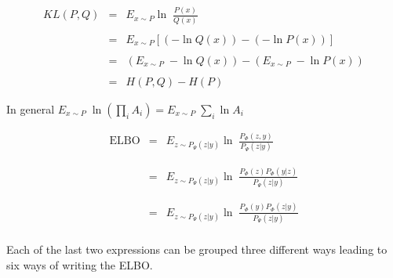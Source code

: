 {

\begin{eqnarray*}
KL(P,Q) & = & E_{x \sim P} \ln \;\frac{P(x)}{Q(x)} \\
\\
& = & E_{x \sim P} \left[(- \ln Q(x)) - (- \ln P(x))\right] \\
\\
& = & (E_{x\sim P} \;-\ln Q(x)) - (E_{x \sim P}\;-\ln P(x)) \\
\\
& = & H(P,Q) - H(P)
\end{eqnarray*}

\vfill
In general $E_{x \sim P} \;\ln \left(\prod_i A_i\right) = E_{x \sim P} \;\sum_i \ln A_i$ 


\begin{eqnarray*}
\mathrm{ELBO} & = & E_{z \sim P_\Psi(z|y)} \ln \;\frac{P_\Phi(z,y)}{P_\Psi(z|y)} \\
\\
\\
 & = & E_{z \sim P_\Psi(z|y)} \ln \;\frac{P_\Phi(z)P_\Phi(y|z)}{P_\Psi(z|y)} \\
\\
\\
 & = & E_{z \sim P_\Psi(z|y)} \ln \;\frac{P_\Phi(y)P_\Phi(z|y)}{P_\Psi(z|y)} \\
\end{eqnarray*}

\vfill
Each of the last two expressions can be grouped three different ways leading to six ways of writing the ELBO.

}

